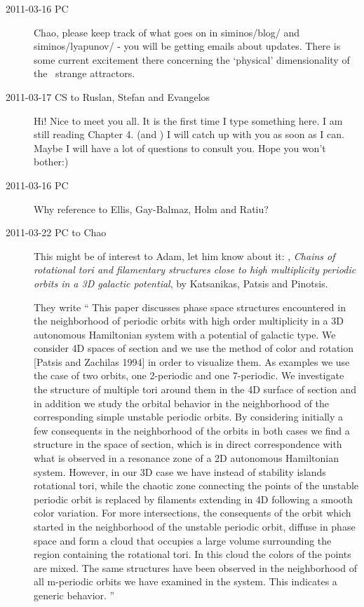 \begin{description}
\item[2011-03-16 PC] Chao, please keep track of what goes on in
siminos/blog/ and siminos/lyapunov/ - you will be getting emails about
updates. There is some current excitement there concerning the `physical'
dimensionality of the \KS\ strange attractors.

\item[2011-03-17 CS to Ruslan, Stefan and Evangelos]
   Hi! Nice to meet you all. It is the first time I type something here.
   I am still reading Chapter 4. (and ) I will catch up with
   you as soon as I can. Maybe I will have a lot of questions to consult
   you. Hope you won't bother:)

\item[2011-03-16 PC] Why reference to Ellis, Gay-Balmaz, Holm
                  and Ratiu?

\item[2011-03-22 PC to Chao]
This might be of interest to Adam, let him know about it:
,
\emph{Chains of rotational tori and filamentary structures close to high
 multiplicity periodic orbits in a 3D galactic potential},
 by Katsanikas, Patsis and Pinotsis.

They write
``
This paper discusses phase space structures encountered in the
neighborhood of periodic orbits with high order multiplicity in a 3D
autonomous Hamiltonian system with a potential of galactic type. We
consider 4D spaces of section and we use the method of color and rotation
[Patsis and Zachilas 1994] in order to visualize them. As examples we use
the case of two orbits, one 2-periodic and one 7-periodic. We investigate
the structure of multiple tori around them in the 4D surface of section
and in addition we study the orbital behavior in the neighborhood of the
corresponding simple unstable periodic orbits. By considering initially a
few consequents in the neighborhood of the orbits in both cases we find a
structure in the space of section, which is in direct correspondence with
what is observed in a resonance zone of a 2D autonomous Hamiltonian
system. However, in our 3D case we have instead of stability islands
rotational tori, while the chaotic zone connecting the points of the
unstable periodic orbit is replaced by filaments extending in 4D
following a smooth color variation. For more intersections, the
consequents of the orbit which started in the neighborhood of the
unstable periodic orbit, diffuse in phase space and form a cloud that
occupies a large volume surrounding the region containing the rotational
tori. In this cloud the colors of the points are mixed. The same
structures have been observed in the neighborhood of all m-periodic
orbits we have examined in the system. This indicates a generic behavior.
''


\end{description}
